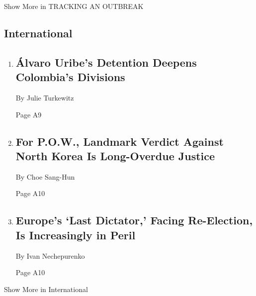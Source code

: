 Show More in TRACKING AN OUTBREAK

\hypertarget{international}{%
\subsection{International}\label{international}}

\begin{enumerate}
\def\labelenumi{\arabic{enumi}.}
\item
  \href{/2020/08/07/world/americas/uribe-colombia-house-arrest.html}{}

  \hypertarget{uxe1lvaro-uribes-detention-deepens-colombias-divisions-1}{%
  \subsection{Álvaro Uribe's Detention Deepens Colombia's
  Divisions}\label{uxe1lvaro-uribes-detention-deepens-colombias-divisions-1}}

  By Julie Turkewitz

  Page A9
\item
  \href{/2020/08/07/world/asia/north-korea-pow-verdict-kim.html}{}

  \hypertarget{for-pow-landmark-verdict-against-north-korea-is-long-overdue-justice-1}{%
  \subsection{For P.O.W., Landmark Verdict Against North Korea Is
  Long-Overdue
  Justice}\label{for-pow-landmark-verdict-against-north-korea-is-long-overdue-justice-1}}

  By Choe Sang-Hun

  Page A10
\item
  \href{/2020/08/07/world/europe/belarus-election-aleksandr-lukashenko.html}{}

  \hypertarget{europes-last-dictator-facing-re-election-is-increasingly-in-peril}{%
  \subsection{Europe's `Last Dictator,' Facing Re-Election, Is
  Increasingly in
  Peril}\label{europes-last-dictator-facing-re-election-is-increasingly-in-peril}}

  By Ivan Nechepurenko

  Page A10
\end{enumerate}

Show More in International

